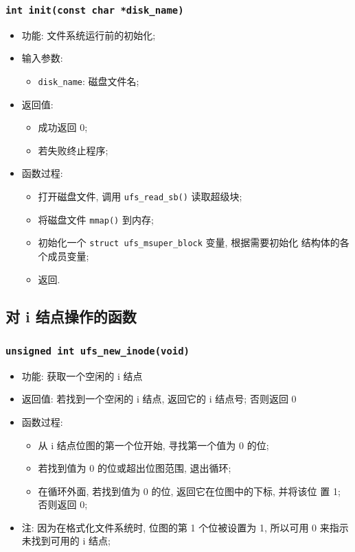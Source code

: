 \documentclass[nofonts, titlepage]{ctexart}
\begin{document}
\subsubsection[\texttt{init}]{\texttt{int init(const char *disk\_name)}}
        \begin{itemize}
\item
  功能: 文件系统运行前的初始化;
\item
  输入参数:

  \begin{itemize}
  \item
    \texttt{disk\_name}: 磁盘文件名;
  \end{itemize}
\item
  返回值:

  \begin{itemize}
  \item
    成功返回 0;
  \item
    若失败终止程序;
  \end{itemize}
\item
  函数过程:

  \begin{itemize}
  \item
    打开磁盘文件, 调用 \texttt{ufs\_read\_sb()} 读取超级块;
  \item
    将磁盘文件 \texttt{mmap()} 到内存;
  \item
    初始化一个 \texttt{struct ufs\_msuper\_block} 变量, 根据需要初始化
    结构体的各个成员变量;
  \item
    返回.
  \end{itemize}
  \end{itemize}
\subsection{对 i 结点操作的函数}\label{ux7cfbux7edfux8c03ux7528ux63a5ux53e3}
  \subsubsection[\texttt{ufs\_new\_inode}]{\texttt{unsigned int ufs\_new\_inode(void)}}
  \begin{itemize}
\item
  功能: 获取一个空闲的 i 结点
\item
  返回值: 若找到一个空闲的 i 结点, 返回它的 i 结点号; 否则返回 0
\item
  函数过程:

  \begin{itemize}
  \item
    从 i 结点位图的第一个位开始, 寻找第一个值为 0 的位;
  \item
    若找到值为 0 的位或超出位图范围, 退出循环;
  \item
    在循环外面, 若找到值为 0 的位, 返回它在位图中的下标, 并将该位 置 1;
    否则返回 0;
  \end{itemize}
\item
  注: 因为在格式化文件系统时, 位图的第 1 个位被设置为 1, 所以可用 0
  来指示未找到可用的 i 结点;
  \end{itemize}
\end{document}
